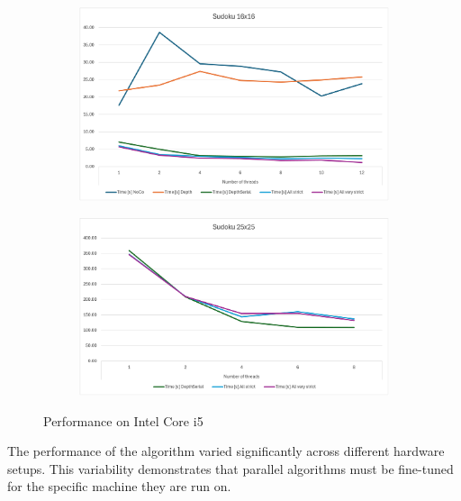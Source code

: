 \documentclass[paper=a4, fontsize=12pt]{scrartcl}
\numberwithin{equation}{section}
\numberwithin{figure}{section}
\numberwithin{table}{section}
\begin{document}
    \begin{figure}[!ht]
        \centering
        \begin{subfigure}[b]{0.49\textwidth}
            \centering
            \includegraphics[width=\textwidth]{image16.png} 
        \end{subfigure}
        \hfill
        \begin{subfigure}[b]{0.49\textwidth}
            \centering
            \includegraphics[width=\textwidth]{image25.png} 
        \end{subfigure}
        \caption{Performance on Intel Core i5}
    \end{figure}
    
    The performance of the algorithm varied significantly across different hardware setups.
    This variability demonstrates that parallel algorithms must be fine-tuned for the specific machine they are run on.
\end{document}
